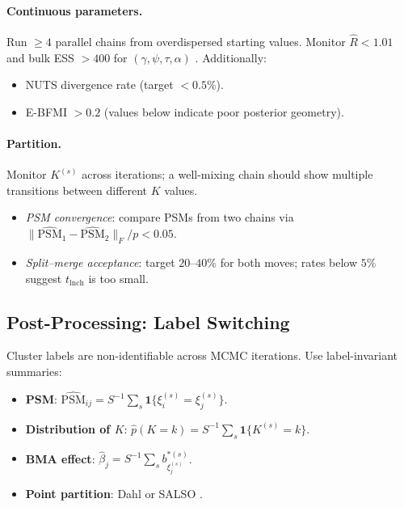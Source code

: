 \documentclass[12pt, a4paper]{article}
\theoremstyle{remark}
\begin{document}
\paragraph{Continuous parameters.}
Run $\geq 4$ parallel chains from overdispersed starting values.
Monitor $\hat R < 1.01$ and bulk ESS $> 400$ for
$(\gamma,\psi,\tau,\alpha)$ \cite{Vehtari2021}.  Additionally:
\begin{itemize}[leftmargin=*, itemsep=2pt]
  \item NUTS divergence rate (target $< 0.5\%$).
  \item E-BFMI $> 0.2$ (values below indicate poor posterior geometry).
\end{itemize}

\paragraph{Partition.}
Monitor $K^{(s)}$ across iterations; a well-mixing chain should
show multiple transitions between different $K$ values.
\begin{itemize}[leftmargin=*, itemsep=2pt]
  \item \textit{PSM convergence}: compare PSMs from two chains via
        $\|\widehat{\mathrm{PSM}}_1 - \widehat{\mathrm{PSM}}_2\|_F / p < 0.05$.
  \item \textit{Split--merge acceptance}: target $20$--$40\%$ for both
        moves; rates below $5\%$ suggest $t_{\mathrm{lnch}}$ is too
        small.
\end{itemize}

\subsection{Post-Processing: Label Switching}

Cluster labels are non-identifiable across MCMC iterations.
Use label-invariant summaries:
\begin{itemize}[leftmargin=*, itemsep=3pt]
  \item \textbf{PSM}: $\widehat{\mathrm{PSM}}_{ij}
        = S^{-1}\sum_{s}\mathbf{1}\{\xi_i^{(s)} = \xi_j^{(s)}\}$.
  \item \textbf{Distribution of $K$}:
        $\hat p(K = k) = S^{-1}\sum_s\mathbf{1}\{K^{(s)} = k\}$.
  \item \textbf{BMA effect}:
        $\hat\beta_j = S^{-1}\sum_s b^{*(s)}_{\xi_j^{(s)}}$.
  \item \textbf{Point partition}: Dahl \cite{Dahl2006} or SALSO
        \cite{Dahl2022}.
\end{itemize}
\end{document}
